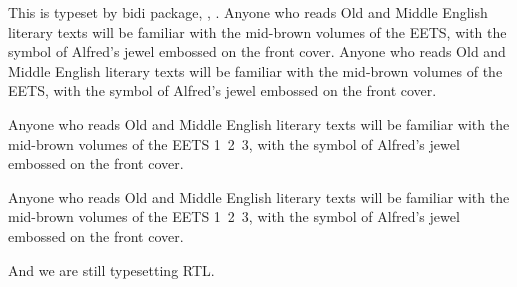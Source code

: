 \documentclass{minimal}
\begin{document}
This is typeset by \textsf{bidi} package, \bidiversion, \bididate.
\setRTL%
Anyone who reads Old and Middle English literary texts will be familiar with the mid-brown volumes of the EETS, with the symbol of Alfred's jewel embossed on the front cover.
\setLTR%
Anyone who reads Old and Middle English literary texts will be familiar with the mid-brown volumes of the EETS, with the symbol of Alfred's jewel embossed on the front cover.
\begin{RTL}
Anyone who reads Old and Middle English  literary texts will be familiar
 with the mid-brown volumes of the EETS \hbox{1 2 3}, with the symbol
 of Alfred's jewel embossed on the front cover.
\begin{LTR}
Anyone who reads Old and Middle English  literary texts will be familiar
 with the mid-brown volumes of the EETS \hbox{1 2 3}, with the symbol
 of Alfred's jewel embossed on the front cover.
\end{LTR}
And we are still typesetting RTL.
\end{RTL}
\end{document}
